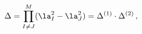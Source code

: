\begin{equation}
\Delta = \prod_{I\neq J}^{M} (\la_I^2 -\la_J^2)= \Delta^{(1)}\cdot
\Delta^{(2)}\, ,
\end{equation}

